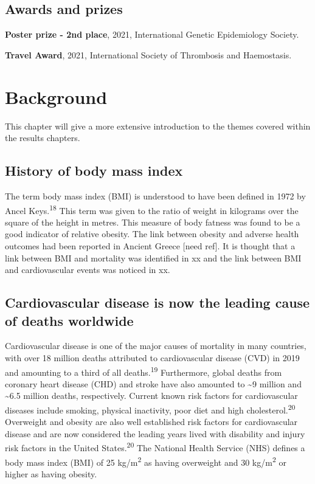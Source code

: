 \documentclass[11pt,twoside]{bristolthesis}
\begin{document}
\hypertarget{awards-and-prizes}{%
\section{Awards and prizes}\label{awards-and-prizes}}

\textbf{Poster prize - 2nd place}, 2021, International Genetic Epidemiology Society.

\textbf{Travel Award}, 2021, International Society of Thrombosis and Haemostasis.

\hypertarget{background}{%
\chapter{Background}\label{background}}

This chapter will give a more extensive introduction to the themes covered within the results chapters.

\hypertarget{history-of-body-mass-index}{%
\section{History of body mass index}\label{history-of-body-mass-index}}

The term body mass index (BMI) is understood to have been defined in 1972 by Ancel Keys.\textsuperscript{18} This term was given to the ratio of weight in kilograms over the square of the height in metres. This measure of body fatness was found to be a good indicator of relative obesity. The link between obesity and adverse health outcomes had been reported in Ancient Greece {[}need ref{]}. It is thought that a link between BMI and mortality was identified in xx and the link between BMI and cardiovascular events was noticed in xx.

\hypertarget{cardiovascular-disease-is-now-the-leading-cause-of-deaths-worldwide}{%
\section{Cardiovascular disease is now the leading cause of deaths worldwide}\label{cardiovascular-disease-is-now-the-leading-cause-of-deaths-worldwide}}

Cardiovascular disease is one of the major causes of mortality in many countries, with over 18 million deaths attributed to cardiovascular disease (CVD) in 2019 and amounting to a third of all deaths.\textsuperscript{19} Furthermore, global deaths from coronary heart disease (CHD) and stroke have also amounted to \textasciitilde9 million and \textasciitilde6.5 million deaths, respectively. Current known risk factors for cardiovascular diseases include smoking, physical inactivity, poor diet and high cholesterol.\textsuperscript{20} Overweight and obesity are also well established risk factors for cardiovascular disease and are now considered the leading years lived with disability and injury risk factors in the United States.\textsuperscript{20} The National Health Service (NHS) defines a body mass index (BMI) of 25 kg/m\textsuperscript{2} as having overweight and 30 kg/m\textsuperscript{2} or higher as having obesity.
\end{document}

